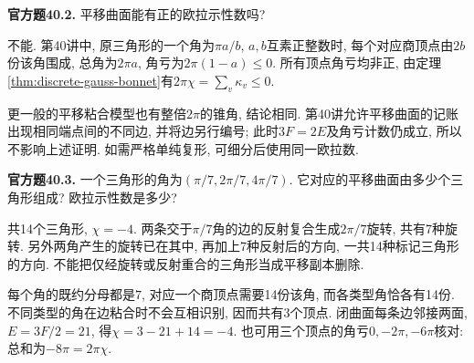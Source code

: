 \begin{exercise}\label{cq:40.2}
\textbf{官方题40.2.} 平移曲面能有正的欧拉示性数吗?
\end{exercise}
\begin{solution}
不能. 第40讲中, 原三角形的一个角为$\pi a/b$, $a,b$互素正整数时, 每个对应商顶点由$2b$份该角围成, 总角为$2\pi a$, 角亏为$2\pi(1-a)\le0$. 所有顶点角亏均非正, 由定理\ref{thm:discrete-gauss-bonnet}有$2\pi\chi=\sum_v\kappa_v\le0$.

更一般的平移粘合模型也有整倍$2\pi$的锥角, 结论相同. 第40讲允许平移曲面的记账出现相同端点间的不同边, 并将边另行编号; 此时$3F=2E$及角亏计数仍成立, 所以不影响上述证明. 如需严格单纯复形, 可细分后使用同一欧拉数.
\end{solution}

\begin{exercise}\label{cq:40.3}
\textbf{官方题40.3.} 一个三角形的角为$(\pi/7,2\pi/7,4\pi/7)$. 它对应的平移曲面由多少个三角形组成? 欧拉示性数是多少?
\end{exercise}
\begin{solution}
共14个三角形, $\chi=-4$. 两条交于$\pi/7$角的边的反射复合生成$2\pi/7$旋转, 共有7种旋转. 另外两角产生的旋转已在其中, 再加上7种反射后的方向, 一共14种标记三角形的方向. 不能把仅经旋转或反射重合的三角形当成平移副本删除.

每个角的既约分母都是$7$, 对应一个商顶点需要14份该角, 而各类型角恰各有14份. 不同类型的角在边粘合时不会互相识别, 因而共有3个顶点. 闭曲面每条边邻接两面, $E=3F/2=21$, 得$\chi=3-21+14=-4$. 也可用三个顶点的角亏$0,-2\pi,-6\pi$核对: 总和为$-8\pi=2\pi\chi$.
\end{solution}
